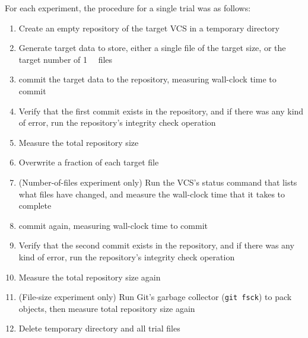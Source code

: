 For each experiment, the procedure for a single trial was as follows:

\begin{enumerate}

    \item Create an empty \gls{repository} of the target \gls{VCS} in a
        temporary directory

    \item Generate target data to store, either a single file of the target
        size, or the target number of \SI{1}{\kibi\byte} files

    \item \Gls{commit} the target data to the \gls{repository}, measuring
        wall-clock time to \gls{commit}

    \item Verify that the first \gls{commit} exists in the \gls{repository}, and
        if there was any kind of error, run the \gls{repository}'s integrity
        check operation

    \item Measure the total \gls{repository} size

    \item Overwrite a fraction of each target file

    \item (Number-of-files experiment only) Run the \gls{VCS}'s status command
        that lists what files have changed, and measure the wall-clock time that
        it takes to complete

    \item \Gls{commit} again, measuring wall-clock time to \gls{commit}

    \item Verify that the second \gls{commit} exists in the \gls{repository},
        and if there was any kind of error, run the \gls{repository}'s integrity
        check operation

    \item Measure the total \gls{repository} size again

    \item (File-size experiment only) Run Git's garbage collector
        (\lstinline{git fsck}) to pack objects, then measure total
        \gls{repository} size again

    \item Delete temporary directory and all trial files

\end{enumerate}

